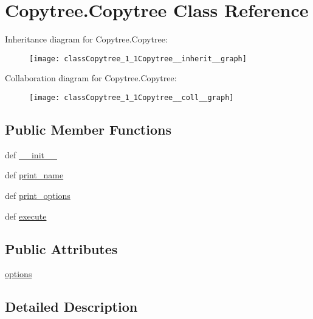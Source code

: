 \hypertarget{classCopytree_1_1Copytree}{\section{Copytree.\-Copytree Class Reference}
\label{classCopytree_1_1Copytree}
}


Inheritance diagram for Copytree.\-Copytree\-:\nopagebreak
\begin{figure}[H]
\begin{center}
\leavevmode
\texttt{[image: classCopytree\_1\_1Copytree\_\_inherit\_\_graph]}
\end{center}
\end{figure}


Collaboration diagram for Copytree.\-Copytree\-:\nopagebreak
\begin{figure}[H]
\begin{center}
\leavevmode
\texttt{[image: classCopytree\_1\_1Copytree\_\_coll\_\_graph]}
\end{center}
\end{figure}
\subsection*{Public Member Functions}
\begin{DoxyCompactItemize}
\item 
def \hyperlink{classCopytree_1_1Copytree_a7dc4242e406f7418ca7e4f0c31b8c524}{\-\_\-\-\_\-init\-\_\-\-\_\-}
\item 
def \hyperlink{classCopytree_1_1Copytree_ae6dbc27735bd3bdcb0113564c50b1c1c}{print\-\_\-name}
\item 
def \hyperlink{classCopytree_1_1Copytree_a34bbcd07e83438b9ec9855065b13a397}{print\-\_\-options}
\item 
def \hyperlink{classCopytree_1_1Copytree_a567584587407c9c6027bd7026e36a366}{execute}
\end{DoxyCompactItemize}
\subsection*{Public Attributes}
\begin{DoxyCompactItemize}
\item 
\hyperlink{classCopytree_1_1Copytree_ab12d2712ffd4aba7ddd4c5ceadec153b}{options}
\end{DoxyCompactItemize}


\subsection{Detailed Description}


